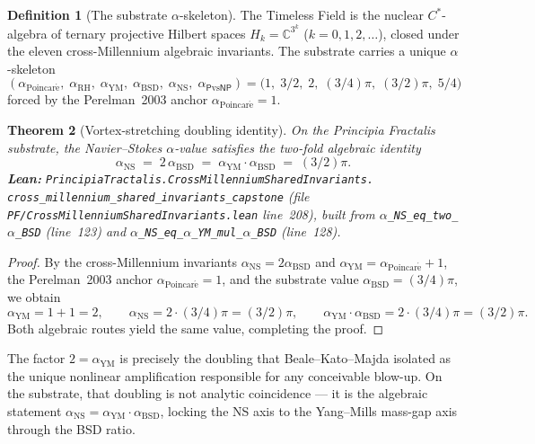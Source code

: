 \documentclass[11pt,a4paper]{article}
\theoremstyle{plain}
\newtheorem{theorem}{Theorem}[section]
\theoremstyle{definition}
\newtheorem{definition}[theorem]{Definition}
\begin{document}
\begin{definition}[The substrate $\alpha$-skeleton]
\label{def:substrate}
The Timeless Field is the nuclear $C^{*}$-algebra of ternary projective
Hilbert spaces $H_{k} = \mathbb{C}^{3^{k}}$ ($k = 0, 1, 2, \ldots$),
closed under the eleven cross-Millennium algebraic invariants. The
substrate carries a unique $\alpha$-skeleton
\[
(\alpha_{\mathrm{Poincar\acute e}},\;\alpha_{\mathrm{RH}},\;
 \alpha_{\mathrm{YM}},\;\alpha_{\mathrm{BSD}},\;
 \alpha_{\mathrm{NS}},\;\alpha_{\mathsf{P}\mathrm{vs}\mathsf{NP}})
 = \bigl(1,\;3/2,\;2,\;(3/4)\pi,\;(3/2)\pi,\;5/4\bigr)
\]
forced by the Perelman~2003 anchor
$\alpha_{\mathrm{Poincar\acute e}} = 1$.
\end{definition}

\begin{theorem}[Vortex-stretching doubling identity]
\label{thm:doubling}
On the Principia Fractalis substrate, the Navier--Stokes
$\alpha$-value satisfies the two-fold algebraic identity
\[
\alpha_{\mathrm{NS}} \;=\; 2\,\alpha_{\mathrm{BSD}}
       \;=\; \alpha_{\mathrm{YM}}\cdot\alpha_{\mathrm{BSD}}
       \;=\; (3/2)\pi.
\]
\textbf{Lean:}
\texttt{PrincipiaTractalis.CrossMillenniumSharedInvariants.\\
cross\_millennium\_shared\_invariants\_capstone} (file
\texttt{PF/CrossMillenniumSharedInvariants.lean} line~208), built from
\texttt{$\alpha$\_NS\_eq\_two\_$\alpha$\_BSD} (line~123) and
\texttt{$\alpha$\_NS\_eq\_$\alpha$\_YM\_mul\_$\alpha$\_BSD}
(line~128).
\end{theorem}

\begin{proof}
By the cross-Millennium invariants
$\alpha_{\mathrm{NS}} = 2\alpha_{\mathrm{BSD}}$ and
$\alpha_{\mathrm{YM}} = \alpha_{\mathrm{Poincar\acute e}} + 1$, the
Perelman~2003 anchor $\alpha_{\mathrm{Poincar\acute e}} = 1$, and the
substrate value $\alpha_{\mathrm{BSD}} = (3/4)\pi$, we obtain
\[
\alpha_{\mathrm{YM}} = 1 + 1 = 2, \qquad
\alpha_{\mathrm{NS}} = 2 \cdot (3/4)\pi = (3/2)\pi, \qquad
\alpha_{\mathrm{YM}}\cdot\alpha_{\mathrm{BSD}}
   = 2\cdot(3/4)\pi = (3/2)\pi.
\]
Both algebraic routes yield the same value, completing the proof.
\end{proof}

The factor $2 = \alpha_{\mathrm{YM}}$ is precisely the doubling that
Beale--Kato--Majda \cite{beale1984} isolated as the unique nonlinear
amplification responsible for any conceivable blow-up. On the
substrate, that doubling is not analytic coincidence --- it is the
algebraic statement
$\alpha_{\mathrm{NS}} = \alpha_{\mathrm{YM}}\cdot\alpha_{\mathrm{BSD}}$,
locking the NS axis to the Yang--Mills mass-gap axis through the BSD
ratio.
\end{document}

